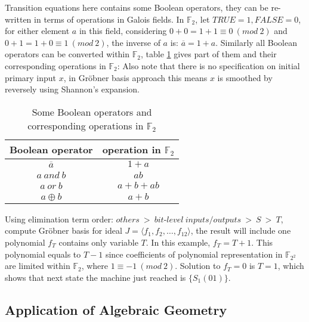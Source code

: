 \documentclass{acm_proc_article-sp}
\begin{document}
Transition equations here contains some Boolean operators, they can be re-written in terms of operations in Galois fields. 
In $\mathbb{F}_{2}$, let $TRUE = 1, FALSE = 0$, for either element $a$ in this field, considering $0 + 0 = 1 + 1 \equiv 0\ (mod\ 2)$
and $0 + 1 = 1 + 0 \equiv 1\ (mod\ 2)$, the inverse of $a$ is: $\overline{a} = 1 + a$. Similarly all Boolean operators
can be converted within $\mathbb{F}_{2}$, table \ref{table:booltogalois_op} gives part of them and their corresponding
operations in $\mathbb{F}_{2}$:
Also note that there is no specification on initial primary input $x$, in Gr\"obner basis approach this means $x$ is smoothed by
reversely using Shannon's expansion.
\begin{table}
\centering
\caption{Some Boolean operators and corresponding operations in $\mathbb{F}_{2}$}
\label{table:booltogalois_op}
\begin{tabular}{|c|c|} \hline
Boolean operator & operation in $\mathbb{F}_{2}$\\ \hline
$\overline{a}$ & $1 + a$\\ \hline
$a\ and\ b$ & $ab$\\ \hline
$a\ or\ b$ & $a + b + ab$\\ \hline
$a \oplus b$ & $a + b$\\
\hline\end{tabular}
\end{table}
Using elimination term order: $others\ >\ bit$-$level\ inputs/outputs\ >\ S\ >\ T$, compute Gr\"obner basis for ideal
$J = \langle f_1, f_2, \dots, f_{12}\rangle $, the result will include one polynomial $f_T$ contains only variable $T$. In this example,
$f_T = T + 1$. This polynomial equals to $T - 1$ since coefficients of polynomial representation in $\mathbb{F}_{2^2}$ are
limited within $\mathbb{F}_{2}$, where $1 \equiv -1\ (mod\ 2)$. Solution to $f_T = 0$ is $T = 1$, which shows that next
state the machine just reached is $\{S_1(01)\}$.

\subsection{Application of Algebraic Geometry}
\end{document}
